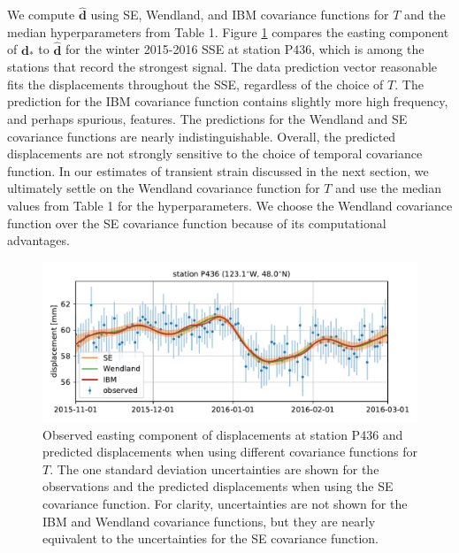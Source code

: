 We compute $\hat{\mathbf{d}}$ using SE, Wendland, and IBM covariance functions for $T$ and the median hyperparameters from Table 1. Figure \ref{ch5:fig:Fit} compares the easting component of $\mathbf{d}_*$ to $\hat{\mathbf{d}}$ for the winter 2015-2016 SSE at station P436, which is among the stations that record the strongest signal. The data prediction vector reasonable fits the displacements throughout the SSE, regardless of the choice of $T$. The prediction for the IBM covariance function contains slightly more high frequency, and perhaps spurious, features. The predictions for the Wendland and SE covariance functions are nearly indistinguishable. Overall, the predicted displacements are not strongly sensitive to the choice of temporal covariance function. In our estimates of transient strain discussed in the next section, we ultimately settle on the Wendland covariance function for $T$ and use the median values from Table 1 for the hyperparameters. We choose the Wendland covariance function over the SE covariance function because of its computational advantages.     

\begin{figure}
\includegraphics{ch5/figures/signal_fit/signal-fit.pdf}
\caption{Observed easting component of displacements at station P436 and predicted displacements when using different covariance functions for $T$. The one standard deviation uncertainties are shown for the observations and the predicted displacements when using the SE covariance function. For clarity, uncertainties are not shown for the IBM and Wendland covariance functions, but they are nearly equivalent to the uncertainties for the SE covariance function.}   
\label{ch5:fig:Fit}
\end{figure}

